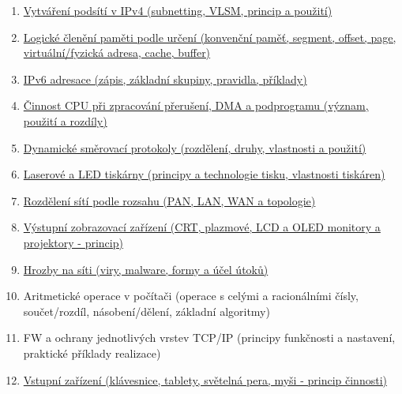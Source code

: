 \documentclass[a4paper,11pt]{article}
\begin{document}
\begin{enumerate}
  \item \hyperref[sec:podsite-ipv4]{Vytváření podsítí v IPv4 (subnetting, VLSM, princip a použití)}
  \item \hyperref[sec:logicke-cleneni-pameti]{Logické členění paměti podle určení (konvenční paměť, segment, offset, page, virtuální/fyzická adresa, cache, buffer)}
  \item \hyperref[sec:ipv6-adresace]{IPv6 adresace (zápis, základní skupiny, pravidla, příklady)}
  \item \hyperref[sec:cpu-preruseni]{Činnost CPU při zpracování přerušení, DMA a podprogramu (význam, použití a rozdíly)}
  \item \hyperref[sec:smerovaci-protokoly]{Dynamické směrovací protokoly (rozdělení, druhy, vlastnosti a použití)}
  \item \hyperref[sec:tiskarny]{Laserové a LED tiskárny (principy a technologie tisku, vlastnosti tiskáren)}
  \item \hyperref[sec:rozdeleni-siti]{Rozdělení sítí podle rozsahu (PAN, LAN, WAN a topologie)}
  \item \hyperref[sec:vystupni-zobrazovaci-zarizeni]{Výstupní zobrazovací zařízení (CRT, plazmové, LCD a OLED monitory a projektory - princip)}
  \item \hyperref[sec:hrozby-na-siti]{Hrozby na síti (viry, malware, formy a účel útoků)}
  \item Aritmetické operace v počítači (operace s celými a racionálními čísly, součet/rozdíl, násobení/dělení, základní algoritmy)
  \item FW a ochrany jednotlivých vrstev TCP/IP (principy funkčnosti a nastavení, praktické příklady realizace)
  \item \hyperref[sec:vstupni-zarizeni]{Vstupní zařízení (klávesnice, tablety, světelná pera, myši - princip činnosti)}
\end{enumerate}
\end{document}
